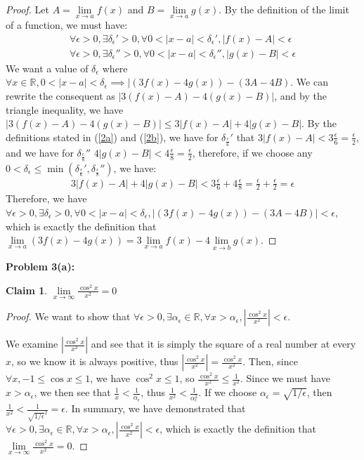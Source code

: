 \documentclass{article}
\newcommand{\reals}{\ensuremath{\mathbb{R}}}
\newcommand{\eps}{\ensuremath{\epsilon}}
\newcommand{\limx}[2]{\ensuremath{\underset{x\to #2 }{\lim} #1 (x)}}
\newcommand{\limf}[1]{\ensuremath{\underset{x\to #1 }{\lim}}}
\newtheorem{clm}{Claim}
\begin{document}
\begin{proof}
	Let $A = \limx{f}{a}$ and $B = \limx{g}{a}$.
	By the definition of the limit of a function, we must have:
	\begin{align}
		\label{2a}
		\forall \eps > 0, \exists \delta_\eps' > 0,
		\forall 0 < |x - a| < \delta_\eps', |f(x) - A| < \eps \\
		\label{2b}
		\forall \eps > 0, \exists \delta_\eps'' > 0,
		\forall 0 < |x - a| < \delta_\eps'', |g(x) - B| < \eps
	\end{align}
	We want a value of $\delta_\eps$
	where $\forall x \in \reals, 0 < | x - a| < \delta_\eps
	\implies |(3f(x) - 4g(x)) - (3A - 4B)$.
	We can rewrite the consequent
	as $|3(f(x) - A) - 4(g(x) - B)|$,
	and by the triangle inequality,
	we have 
	$|3(f(x) - A) - 4(g(x) - B)| \le 3|f(x) - A| + 4|g(x) - B|$.
	By the definitions stated in (\ref{2a}) and (\ref{2b}),
	we have for $\delta_{\frac{\eps}{6}}'$
	that
	$3|f(x) - A| < 3 \frac{\eps}{6} = \frac{\eps}{2}$,
	and
	we have for $\delta_{\frac{\eps}{8}}''$
	$4|g(x) - B| < 4 \frac{\eps}{8} = \frac{\eps}{2}$,
	therefore,
	if we choose any $0 < \delta_\eps \le \min(\delta_\frac{\eps}{6}',\delta_\frac{\eps}{8}'')$,
	we have:
	\begin{align}
		3|f(x) - A| + 4|g(x) - B| < 3\frac{\eps}{6} + 4\frac{\eps}{8} = \frac{\eps}{2} + \frac{\eps}{2} = \eps
	\end{align}
	Therefore,
	we have
	$\forall \eps > 0,
	\exists \delta_\eps > 0,
	\forall 0 < | x - a | < \delta_\eps,
	|(3f(x) - 4g(x)) - (3A - 4B)| < \eps$,
	which is exactly the definition that
	$\underset{x \to a}{\lim} (3f(x) - 4g(x))  = 3\limx{f}{a} - 4\limx{g}{b}$.
\end{proof}

\textbf{Problem 3(a):}

\begin{clm}
	$\limf{\infty}\frac{\cos^2x}{x^2} = 0$
\end{clm}

\begin{proof}
	We want to show
	that $\forall \eps > 0,
	\exists \alpha_\eps \in \reals,
	\forall x > \alpha_\eps,
	|\frac{\cos^2x}{x^2}| < \eps$.

	We examine $|\frac{\cos^2x}{x^2}|$
	and see that it is simply
	the square of a real number at every $x$,
	so we know it is always positive,
	thus $|\frac{\cos^2x}{x^2}| = \frac{\cos^2x}{x^2}$.
	Then, since $\forall x, -1 \le \cos x \le 1$,
	we have $\cos^2x \le 1$,
	so $\frac{\cos^2x}{x^2} \le \frac{1}{x^2}$.
	Since we must have $x > \alpha_\eps$,
	we then see that $\frac{1}{x} < \frac{1}{\alpha_\eps}$,
	thus $\frac{1}{x^2} < \frac{1}{\alpha_\eps^2}$.
	If we choose $\alpha_\eps = \sqrt{1/\eps}$,
	then $\frac{1}{x^2} < \frac{1}{\sqrt{1/\eps}^2} = \eps$.
	In summary,
	we have demonstrated
	that
	$\forall \eps > 0,
	\exists \alpha_\eps \in \reals,
	\forall x > \alpha_\eps,
	|\frac{\cos^2x}{x^2}| < \eps$,
	which is exactly the definition that
	$\limf{\infty}\frac{\cos^2x}{x^2} = 0$.
\end{proof}
\end{document}
